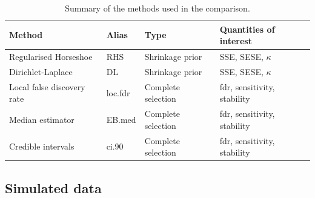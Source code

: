 \documentclass[american,]{article}
\theoremstyle{definition}
\begin{document}
\begin{table}[tp]
\scriptsize
\centering
\begin{tabular}{l|l|l|l}
  \hline
 Method & Alias & Type & Quantities of interest \\ 
  \hline
 Regularised Horseshoe & RHS & Shrinkage prior & SSE, SESE, $\kappa$ \\
 Dirichlet-Laplace & DL & Shrinkage prior & SSE, SESE, $\kappa$ \\
 Local false discovery rate & loc.fdr & Complete selection & fdr, sensitivity, stability \\
 Median estimator & EB.med & Complete selection & fdr, sensitivity, stability \\
 Credible intervals & ci.90 & Complete selection & fdr, sensitivity, stability \\
 \hline
\end{tabular}
\caption{Summary of the methods used in the comparison.}
\label{tab:comparison}
\end{table}

\hypertarget{simulated-data}{%
\subsection{Simulated data}\label{simulated-data}}
\end{document}
